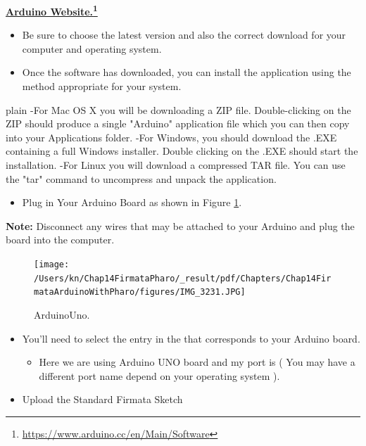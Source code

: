 \documentclass[10pt,twoside,english]{_support/latex/sbabook/sbabook}
\begin{document}
\textbf{\href{https://www.arduino.cc/en/Main/Software}{Arduino Website.}\footnote{\url{https://www.arduino.cc/en/Main/Software}}} 

\begin{itemize}
\item Be sure to choose the latest version and also the correct download for your computer and operating system.
\item Once the software has downloaded, you can install the application using the method appropriate for your system. 
\end{itemize}

\begin{displaycode}{plain}
  -For Mac OS X you will be downloading a ZIP file. Double-clicking on the ZIP should produce a single "Arduino" application file which you can then copy into your Applications folder.
  -For Windows, you should download the .EXE containing a full Windows installer. Double clicking on the .EXE should start the installation.
  -For Linux you will download a compressed TAR file. You can use the "tar" command to uncompress and unpack the application.
\end{displaycode}

\begin{itemize}
\item Plug in Your Arduino Board as shown in Figure \ref{ArduinoConnection}.
\end{itemize}

\textbf{Note:} Disconnect any wires that may be attached to your Arduino and plug the board into the computer.

\begin{figure}

\begin{center}
\texttt{[image: /Users/kn/Chap14FirmataPharo/\_result/pdf/Chapters/Chap14FirmataArduinoWithPharo/figures/IMG\_3231.JPG]}\caption{ArduinoUno.\label{ArduinoConnection}}\end{center}
\end{figure}


\begin{itemize}
\item You'll need to select the entry in the  that corresponds to your Arduino board. 
\begin{itemize}
\item Here we are using Arduino UNO board and my port is  ( You may have a different port name depend on your operating system ).
\end{itemize}

\item Upload the Standard Firmata Sketch
\end{itemize}
\end{document}
